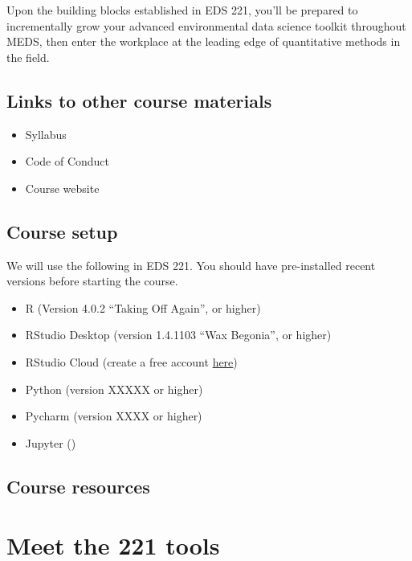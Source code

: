 \documentclass[
]{book}
\providecommand{\tightlist}{%
  \setlength{\itemsep}{0pt}\setlength{\parskip}{0pt}}
\begin{document}
Upon the building blocks established in EDS 221, you'll be prepared to incrementally grow your advanced environmental data science toolkit throughout MEDS, then enter the workplace at the leading edge of quantitative methods in the field.

\hypertarget{links-to-other-course-materials}{%
\section{Links to other course materials}\label{links-to-other-course-materials}}

\begin{itemize}
\tightlist
\item
  Syllabus
\item
  Code of Conduct
\item
  Course website
\end{itemize}

\hypertarget{course-setup}{%
\section{Course setup}\label{course-setup}}

We will use the following in EDS 221. You should have pre-installed recent versions before starting the course.

\begin{itemize}
\tightlist
\item
  R (Version 4.0.2 ``Taking Off Again'', or higher)
\item
  RStudio Desktop (version 1.4.1103 ``Wax Begonia'', or higher)
\item
  RStudio Cloud (create a free account \href{https://rstudio.cloud/}{here})
\item
  Python (version XXXXX or higher)
\item
  Pycharm (version XXXX or higher)
\item
  Jupyter ()
\end{itemize}

\hypertarget{course-resources}{%
\section{Course resources}\label{course-resources}}

\hypertarget{r-py}{%
\chapter{Meet the 221 tools}\label{r-py}}
\end{document}
